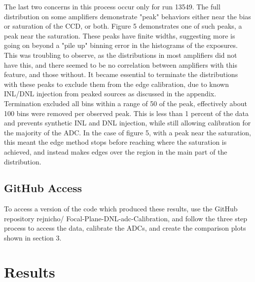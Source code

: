 \documentclass[11pt, letterpaper]{article}
\begin{document}
The last two concerns in this process occur only for run 13549.  
The full distribution on some amplifiers demonstrate "peak" behaviors either near the bias or saturation of the CCD, or both.
Figure 5 demonstrates one of such peaks, a peak near the saturation.  
These peaks have finite widths, suggesting more is going on beyond a "pile up" binning error in the histograms of the exposures. 
This was troubling to observe, as the distributions in most amplifiers did not have this, and there seemed to be no correlation between amplifiers with this feature, and those without. 
It became essential to terminate the distributions with these peaks to exclude them from the edge calibration, due to known INL/DNL injection from peaked sources as discussed in the appendix. 
Termination excluded all bins within a range of 50 of the peak, effectively about 100 bins were removed per observed peak. 
This is less than 1 percent of the data and prevents synthetic INL and DNL injection, while still allowing calibration for the majority of the ADC. 
In the case of figure 5, with a peak near the saturation, this meant the edge method stops before reaching where the saturation is achieved, and instead makes edges over the region in the main part of the distribution. 

\subsection{GitHub Access}
\indent 


To access a version of the code which produced these results, use the GitHub repository rejnicho/
Focal-Plane-DNL-adc-Calibration, and follow the three step process to access the data, calibrate the ADCs, and create the comparison plots shown in section 3. 

\section{Results}
\indent
\end{document}
